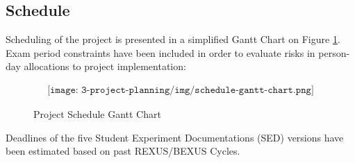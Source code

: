 \subsection{Schedule}

Scheduling of the project is presented in a simplified Gantt Chart on Figure \ref{fig:schedule-gantt-chart}. Exam period constraints have been included in order to evaluate risks in person-day allocations to project implementation:

\begin{figure}[H]
    \begin{align*}
        \texttt{[image: 3-project-planning/img/schedule-gantt-chart.png]}
    \end{align*}
    \caption{Project Schedule Gantt Chart}\label{fig:schedule-gantt-chart}
\end{figure}

Deadlines of the five Student Experiment Documentations (SED) versions have been estimated based on past REXUS/BEXUS Cycles.